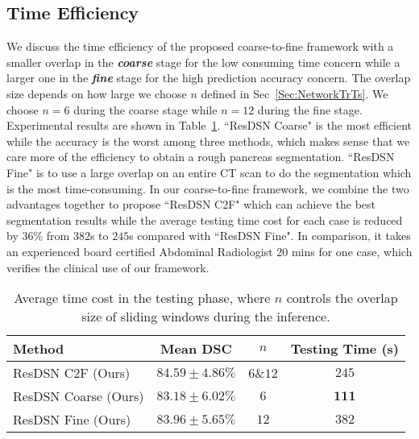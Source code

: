 \documentclass[10pt,twocolumn,letterpaper]{article}
\begin{document}
\subsection{Time Efficiency}\label{Sec:DisTimeCost}
We discuss the time efficiency of the proposed coarse-to-fine framework with a smaller overlap in the \textit{\textbf{coarse}} stage for the low consuming time concern while a larger one in the \textit{\textbf{fine}} stage for the high prediction accuracy concern. The overlap size depends on how large we choose $n$ defined in Sec~\ref{Sec:NetworkTrTs}. We choose $n=6$ during the coarse stage while $n=12$ during the fine stage. Experimental results are shown in Table~\ref{Tab:NIHTimeCost}. ``ResDSN Coarse" is the most efficient while the accuracy is the worst among three methods, which makes sense that we care more of the efficiency to obtain a rough pancreas segmentation. ``ResDSN Fine" is to use a large overlap on an entire CT scan to do the segmentation which is the most time-consuming. In our coarse-to-fine framework, we combine the two advantages together to propose ``ResDSN C2F" which can achieve the best segmentation results while the average testing time cost for each case is reduced by $36\%$ from $382$s to $245$s compared with ``ResDSN Fine". In comparison, it takes an experienced board certified Abdominal Radiologist 20 mins for one case, which verifies the clinical use of our framework.

\begin{table}[tb]
\footnotesize
\begin{center}
\begin{tabular}{lccc}\toprule
Method				& Mean DSC			& $n$ &Testing Time (s) \\
\hline
{ResDSN C2F (Ours)}  & $\bm{84.59\pm{4.86}}\%$ & $6\&12$	& $245$\\
{ResDSN Coarse (Ours)}  & $83.18\pm{6.02}\%$ & $6$	& $\bm{111}$\\
{ResDSN Fine (Ours)}	& $83.96\pm{5.65}\%$ & $12$	& $382$\\
\bottomrule
\end{tabular}
\end{center}
\caption{
    Average time cost in the testing phase, where $n$ controls the overlap size of sliding windows during the inference. 
}
\vspace{-0.4cm}
\label{Tab:NIHTimeCost}
\end{table}
\end{document}

